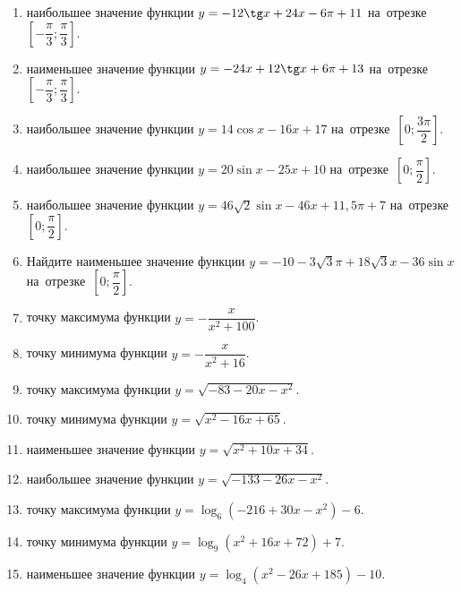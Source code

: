 \documentclass[a4paper,10pt]{article}
\begin{document}
\begin{enumerate}
\item {} наибольшее значение функции $y=-12\tg x +24x-6\pi +11$ на~отрезке~$\left[-\dfrac{\pi}{3};\dfrac{\pi}{3}\right]$.

\item {} наименьшее значение функции $y=-24x +12\tg x+6\pi+13$ на~отрезке~$\left[-\dfrac{\pi}{3};\dfrac{\pi}{3}\right]$.

\item {} наибольшее значение функции $y=14\cos x-16x+17$ на~отрезке~$\left[0;\dfrac{3\pi}{2}\right]$.

\item {} наибольшее значение функции $y=20\sin x-25x+10$ на~отрезке~$\left[0;\dfrac{\pi}{2}\right]$.

\item {} наибольшее значение функции $y=46\sqrt{2}\sin x-46x+11,5\pi +7$ на~отрезке~$\left[0;\dfrac{\pi}{2}\right]$.

\item Найдите наименьшее значение функции $y=-10-3\sqrt{3}\pi+18\sqrt{3}x-36\sin x$ на~отрезке~$\left[0;\dfrac{\pi}{2}\right]$.

\item {} точку максимума функции $y=-\dfrac{x}{ x^2 +100}$.

\item {} точку минимума функции $y=-\dfrac{x}{ x^2 +16}$.

\item {} точку максимума функции $y=\sqrt{-83-20x-x^2}$.

\item {} точку минимума функции $y=\sqrt{x^2-16x+65}$.

\item {} наименьшее значение функции $y=\sqrt{x^2+10x+34}$.

\item {} наибольшее значение функции $y=\sqrt{-133-26x-x^2}$.

\item {} точку максимума функции $y=\log_6\left(-216+30x-x^2\right)-6$.

\item {} точку минимума функции $y=\log_9\left(x^2+16x+72\right)+7$.

\item {} наименьшее значение функции $y=\log_4\left(x^2-26x+185\right)-10$.


\end{enumerate}
\end{document}
